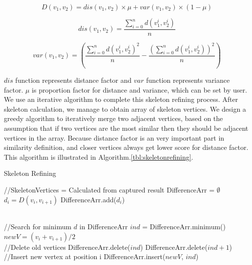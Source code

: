 \documentclass[10pt,journal,compsoc]{IEEEtran}
\begin{document}
\begin{equation}
D(v_{1}, v_{2}) = dis(v_{1}, v_{2})\times \mu + var(v_{1}, v_{2}) \times (1-\mu)
\label{eq:similarityeq}
\end{equation}

\begin{equation}
dis(v_{1}, v_{2}) = \dfrac{\sum_{i = 0}^{n}{d(v_{1}^{i}, v_{2}^{i})}}{n}
\label{eq:distance}
\end{equation}

\begin{equation}
var(v_{1}, v_{2}) = (\dfrac{\sum_{i = 0}^{n}{d(v_{1}^{i}, v_{2}^{i})}^{2}}{n} - \dfrac{(\sum_{i = 0}^{n}{d(v_{1}^{i}, v_{2}^{i})})^{2}}{n})
\label{eq:variance}
\end{equation}

$dis$ function represents distance factor and $var$ function represents variance factor. $\mu$ is proportion factor for distance and variance, which can be set by user.\\

We use an iterative algorithm to complete this skeleton refining process. After skeleton calculation, we manage to obtain array of skeleton vertices. We design a greedy algorithm to iteratively merge two adjacent vertices, based on the assumption that if two vertices are the most similar then they should be adjacent vertices in the array. Because distance factor is an very important part in similarity definition, and closer vertices always get lower score for distance factor. This algorithm is illustrated in Algorithm.\ref{tbl:skeletonrefining}.\\

    \renewcommand{\algorithmicrequire}{\textbf{Input:}}
    \renewcommand{\algorithmicensure}{\textbf{Output:}}

    \begin{algorithm}
        \caption{Skeleton Refining}
        \label{tbl:skeletonrefining}
        \begin{algorithmic}[1]
            \State //SkeletonVertices = Calculated from captured result
                \State DifferenceArr = $\emptyset$
                    \State $d_i = D(v_{i}, v_{i+1})$
                    \State DifferenceArr.add($d_i$)
                \EndFor

                \\
                \State //Search for minimum $d$ in DifferenceArr
                \State $ind$ = DifferenceArr.minimum()
                \State $newV = (v_{i} + v_{i+1}) /2$
                \\
                \State //Delete old vertices
                \State DifferenceArr.delete($ind$)
                \State DifferenceArr.delete($ind+1$)
                \\
                \State //Insert new vertex at position i
                \State DifferenceArr.insert($newV$, $ind$)

            \EndWhile
        \end{algorithmic}
    \end{algorithm}
\end{document}
